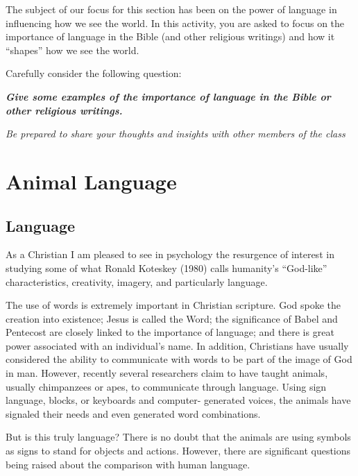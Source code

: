 \documentclass[
]{book}
\begin{document}
\begin{reflect}
The subject of our focus for this section has been on the power of language in influencing how we see the world. In this activity, you are asked to focus on the importance of language in the Bible (and other religious writings) and how it ``shapes'' how we see the world.

Carefully consider the following question:

\textbf{\emph{Give some examples of the importance of language in the Bible or other religious writings.}}

\emph{Be prepared to share your thoughts and insights with other members of the class}
\end{reflect}

\hypertarget{animal-language}{%
\section{Animal Language}\label{animal-language}}

\hypertarget{language}{%
\subsection*{Language}\label{language}}

As a Christian I am pleased to see in psychology the resurgence of interest in studying some of what Ronald Koteskey (1980) calls humanity's ``God-like'' characteristics, creativity, imagery, and particularly language.

The use of words is extremely important in Christian scripture. God spoke the creation into existence; Jesus is called the Word; the significance of Babel and Pentecost are closely linked to the importance of language; and there is great power associated with an individual's name. In addition, Christians have usually considered the ability to communicate with words to be part of the image of God in man. However, recently several researchers claim to have taught animals, usually chimpanzees or apes, to communicate through language. Using sign language, blocks, or keyboards and computer- generated voices, the animals have signaled their needs and even generated word combinations.

But is this truly language? There is no doubt that the animals are using symbols as signs to stand for objects and actions. However, there are significant questions being raised about the comparison with human language.
\end{document}
